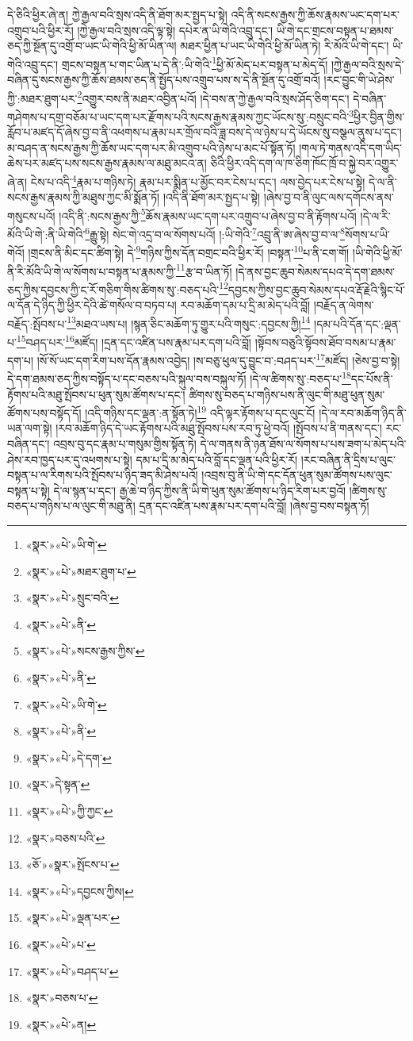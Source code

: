 དེ་ཅིའི་ཕྱིར་ཞེ་ན། ཀྱེ་རྒྱལ་བའི་སྲས་འདི་ནི་ཐོག་མར་སྤྱད་པ་སྟེ། འདི་ནི་སངས་རྒྱས་ཀྱི་ཆོས་རྣམས་ཡང་དག་པར་འགྲུབ་པའི་ཕྱིར་རོ། །ཀྱེ་རྒྱལ་བའི་སྲས་འདི་ལྟ་སྟེ། དཔེར་ན་ཡི་གེའི་འབྲུ་དང་། ཡི་གེ་དང་གྲངས་བསྟན་པ་ཐམས་ཅད་ཀྱི་སྔོན་དུ་འགྲོ་བ་ཡང་ཡི་གེའི་ཕྱི་མོ་ཡིན་ལ། མཐར་ཕྱིན་པ་ཡང་ཡི་གེའི་ཕྱི་མོ་ཡིན་ཏེ། རི་མོའི་ཡི་གེ་དང་། ཡི་གེའི་འབྲུ་དང་། གྲངས་བསྟན་པ་གང་ཡིན་པ་དེ་ནི་:ཡི་གེའི་\footnote{«སྣར་»«པེ་»ཡི་གེ་}ཕྱི་མོ་མེད་པར་བསྟན་པ་མེད་དོ། །ཀྱེ་རྒྱལ་བའི་སྲས་དེ་བཞིན་དུ་སངས་རྒྱས་ཀྱི་ཆོས་ཐམས་ཅད་ནི་སྤྱོད་པས་འགྲུབ་པས་ས་དེ་ནི་སྔོན་དུ་འགྲོ་བའོ། །རང་བྱུང་གི་ཡེ་ཤེས་ཀྱི་:མཐར་ཐུག་པར་\footnote{«སྣར་»«པེ་»མཐར་ཐུག་པ་}འགྱུར་བས་ནི་མཐར་འབྱིན་པའོ། །དེ་བས་ན་ཀྱེ་རྒྱལ་བའི་སྲས་ཤོད་ཅིག་དང་། དེ་བཞིན་གཤེགས་པ་དགྲ་བཅོམ་པ་ཡང་དག་པར་རྫོགས་པའི་སངས་རྒྱས་རྣམས་ཀྱང་ཡོངས་སུ་:བསྲུང་བའི་\footnote{«སྣར་»«པེ་»སྲུང་བའི་}ཕྱིར་བྱིན་གྱིས་རློབ་པ་མཛད་དོ་ཞེས་བྱ་བ་ནི་འཕགས་པ་རྣམ་པར་གྲོལ་བའི་ཟླ་བས་དེ་ལ་ཉེས་པ་དེ་ཡོངས་སུ་བསྩལ་ནུས་པ་དང་། མ་བཤད་ན་སངས་རྒྱས་ཀྱི་ཆོས་ཡང་དག་པར་མི་འགྲུབ་པའི་ཉེས་པ་མང་པོ་སྟོན་ཏོ། །གལ་ཏེ་གནས་འདི་དག་ཡིད་ཆེས་པར་མཛད་པས་སངས་རྒྱས་རྣམས་ལ་མཐུ་མངའ་ན། ཅིའི་ཕྱིར་འདི་དག་ལ་ཁ་ཅིག་ཁོང་ཁྲོ་བ་སྐྱེ་བར་འགྱུར་ཞེ་ན། ངེས་པ་འདི་\footnote{«སྣར་»«པེ་»ནི་}རྣམ་པ་གཉིས་ཏེ། རྣམ་པར་སྨིན་པ་མྱོང་བར་ངེས་པ་དང་། ལས་བྱེད་པར་ངེས་པ་སྟེ། དེ་ལ་ནི་སངས་རྒྱས་རྣམས་ཀྱི་མཐུས་ཀྱང་མི་སྨོན་ཏོ། །འདི་ནི་ཐོག་མར་སྤྱད་པ་སྟེ། །ཞེས་བྱ་བ་ནི་ལུང་ལས་དགོངས་ནས་གསུངས་པའོ། །འདི་ནི་:སངས་རྒྱས་ཀྱི་\footnote{«སྣར་»«པེ་»སངས་རྒྱས་ཀྱིས་}ཆོས་རྣམས་ཡང་དག་པར་འགྲུབ་པ་ཞེས་བྱ་བ་ནི་རྟོགས་པའོ། །དེ་ལ་རི་མོའི་ཡི་གེ་:ནི་ཡི་གེའི་\footnote{«སྣར་»«པེ་»ནི་}རྒྱུ་སྟེ། སེང་གེ་འདྲ་བ་ལ་སོགས་པའོ། །:ཡི་གེའི་\footnote{«སྣར་»«པེ་»ཡི་གེ་}འབྲུ་ནི་ཨ་ཞེས་བྱ་བ་ལ་\footnote{«སྣར་»«པེ་»ནི་}སོགས་པ་ཡི་གེའོ། །གྲངས་ནི་མིང་དང་ཚིག་སྟེ། དེ་\footnote{«སྣར་»«པེ་»དེ་དག་}གཉིས་ཀྱིས་དོན་བགྲང་བའི་ཕྱིར་རོ། །བསྟན་\footnote{«སྣར་»དེ་སྟན་}པ་ནི་ངག་གོ། །ཡི་གེའི་ཕྱི་མོ་ནི་རི་མོའི་ཡི་གེ་ལ་སོགས་པ་བསྟན་པ་རྣམས་ཀྱི་\footnote{«སྣར་»«པེ་»ཀྱི་ཀྱང་}རྩ་བ་ཡིན་ཏོ། །དེ་ནས་བྱང་ཆུབ་སེམས་དཔའ་དེ་དག་ཐམས་ཅད་ཀྱིས་དབྱངས་ཀྱི་ང་རོ་གཅིག་གིས་ཚིགས་སུ་:བཅད་པའི་\footnote{«སྣར་»བཅས་པའི་}དབྱངས་ཀྱིས་བྱང་ཆུབ་སེམས་དཔའ་རྡོ་རྗེའི་སྙིང་པོ་ལ་དོན་དེ་ཉིད་ཀྱི་ཕྱིར་དེའི་ཚེ་གསོལ་བ་བཏབ་པ། རབ་མཆོག་དམ་པ་དྲི་མ་མེད་པའི་བློ། །བརྗོད་ན་ལེགས་བརྗོད་:སྤོབས་པ་\footnote{«ཅོ་»«སྣར་»སྤོངས་པ་}མཐའ་ཡས་པ། །སྙན་ཅིང་མཆོག་ཏུ་གྱུར་པའི་གསུང་:དབྱངས་ཀྱི།\footnote{«སྣར་»«པེ་»དབྱངས་ཀྱིས།} །དམ་པའི་དོན་དང་:ལྡན་པ་\footnote{«སྣར་»«པེ་»ལྡན་པར་}བཤད་པར་\footnote{«སྣར་»«པེ་»པ་}མཛོད། །དྲན་དང་འཛིན་པས་རྣམ་པར་དག་པའི་བློ། །སྟོབས་བཅུའི་སྟོབས་ཐོབ་བསམ་པ་རྣམ་དག་པ། །སོ་སོ་ཡང་དག་རིག་པས་དོན་རྣམས་འབྱེད། །ས་བཅུ་ཕུལ་དུ་བྱུང་བ་:བཤད་པར་\footnote{«སྣར་»«པེ་»བཤད་པ་}མཛོད། །ཅེས་བྱ་བ་སྟེ། དེ་དག་ཐམས་ཅད་ཀྱིས་བསྟོད་པ་དང་བཅས་པའི་སྐུལ་བས་བསྐུལ་ཏོ། །དེ་ལ་ཚིགས་སུ་:བཅད་པ་\footnote{«སྣར་»བཅས་པ་}དང་པོས་ནི་རྟོགས་པའི་མཐུ་སྤོབས་པ་ཕུན་སུམ་ཚོགས་པ་དང་། ཚིགས་སུ་བཅད་པ་གཉིས་པས་ནི་ལུང་གི་མཐུ་ཕུན་སུམ་ཚོགས་པས་བསྟོད་དོ། །འདི་གཉིས་དང་ལྡན་:ན་སྟོན་ཏེ།\footnote{«སྣར་»«པེ་»ན།} འདི་ལྟར་རྟོགས་པ་དང་ལུང་ངོ། །དེ་ལ་རབ་མཆོག་ཉིད་ནི་ཡན་ལག་སྟེ། །རབ་མཆོག་ཉིད་དེ་ཡང་རྟོགས་པའི་མཐུ་སྤོབས་པས་རབ་ཏུ་ཕྱེ་བའོ། །སྤོབས་པ་ནི་གནས་དང་། རང་བཞིན་དང་། འབྲས་བུ་དང་རྣམ་པ་གསུམ་གྱིས་སྟོན་ཏེ། དེ་ལ་གནས་ནི་ཉན་ཐོས་ལ་སོགས་པ་པས་ཟག་པ་མེད་པའི་ཤེས་རབ་ཁྱད་པར་དུ་འཕགས་པ་སྟེ། དམ་པ་དྲི་མ་མེད་པའི་བློ་དང་ལྡན་པའི་ཕྱིར་རོ། །རང་བཞིན་ནི་དྲིས་པ་ལུང་བསྟན་པ་ལ་རིགས་པའི་སྤོབས་པ་ཉིད་ཟད་མི་ཤེས་པའོ། །འབྲས་བུ་ནི་ཡི་གེ་དང་དོན་ཕུན་སུམ་ཚོགས་པས་ལུང་བསྟན་པ་སྟེ། དེ་ལ་སྙན་པ་དང་། རྒྱ་ཆེ་བ་ཉིད་ཀྱིས་ནི་ཡི་གེ་ཕུན་སུམ་ཚོགས་པ་ཉིད་རིག་པར་བྱའོ། །ཚིགས་སུ་བཅད་པ་གཉིས་པ་ལ་ལུང་གི་མཐུ་ནི། དྲན་དང་འཛིན་པས་རྣམ་པར་དག་པའི་བློ། །ཞེས་བྱ་བས་བསྟན་ཏོ། 